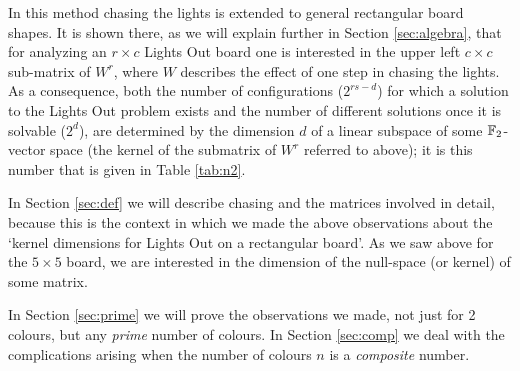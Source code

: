 In \cite{leach17} this method chasing the lights is extended to general
rectangular board shapes.  It is shown there, as we will explain further
in Section
\ref{sec:algebra}, that for analyzing an $r \times c$ Lights Out
board one is interested in the upper left $c \times c$ sub-matrix of
$W^{r}$, where $W$ describes the effect of one step in chasing the lights.
As a consequence, both the number of configurations ($2^{rs-d}$)
for which a solution to the Lights Out problem exists and the number
of different solutions once it is solvable ($2^d$), are determined
by the dimension $d$ of a linear subspace of some $\mathbb F_2$-vector space
(the kernel of the submatrix of $W^r$ referred to above); it is this number
that is given in Table \ref{tab:n2}.

In Section \ref{sec:def}  we will describe chasing and the matrices involved
in detail, because this is the context in which we made
the above observations about the `kernel dimensions for
Lights Out on a rectangular board'. As we saw above for the $5\times 5$
board, we are interested in the dimension of 
the null-space (or kernel) of some matrix.

In Section \ref{sec:prime} we will prove the observations we made,
not just for 2 colours, but any {\it prime} number of colours.
In Section \ref{sec:comp} we deal with the complications arising
when the number of colours $n$ is a {\it composite} number.


